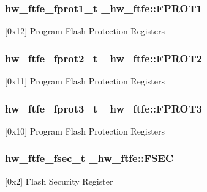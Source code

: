\subsubsection[{\texorpdfstring{F\+P\+R\+O\+T1}{FPROT1}}]{ {\bf hw\+\_\+ftfe\+\_\+fprot1\+\_\+t} \+\_\+hw\+\_\+ftfe\+::\+F\+P\+R\+O\+T1}\hypertarget{struct__hw__ftfe_acb23a282239b6ec6378d99218078504e}{}\label{struct__hw__ftfe_acb23a282239b6ec6378d99218078504e}
\mbox{[}0x12\mbox{]} Program Flash Protection Registers 
\subsubsection[{\texorpdfstring{F\+P\+R\+O\+T2}{FPROT2}}]{ {\bf hw\+\_\+ftfe\+\_\+fprot2\+\_\+t} \+\_\+hw\+\_\+ftfe\+::\+F\+P\+R\+O\+T2}\hypertarget{struct__hw__ftfe_a860b1772fd409f3168df994f34e2b3ee}{}\label{struct__hw__ftfe_a860b1772fd409f3168df994f34e2b3ee}
\mbox{[}0x11\mbox{]} Program Flash Protection Registers 
\subsubsection[{\texorpdfstring{F\+P\+R\+O\+T3}{FPROT3}}]{ {\bf hw\+\_\+ftfe\+\_\+fprot3\+\_\+t} \+\_\+hw\+\_\+ftfe\+::\+F\+P\+R\+O\+T3}\hypertarget{struct__hw__ftfe_a822b9751e6b91019cead66938bcffa07}{}\label{struct__hw__ftfe_a822b9751e6b91019cead66938bcffa07}
\mbox{[}0x10\mbox{]} Program Flash Protection Registers 
\subsubsection[{\texorpdfstring{F\+S\+EC}{FSEC}}]{ {\bf hw\+\_\+ftfe\+\_\+fsec\+\_\+t} \+\_\+hw\+\_\+ftfe\+::\+F\+S\+EC}\hypertarget{struct__hw__ftfe_afe347c281e95fbb6ed7c410955a5b0a1}{}\label{struct__hw__ftfe_afe347c281e95fbb6ed7c410955a5b0a1}
\mbox{[}0x2\mbox{]} Flash Security Register 
